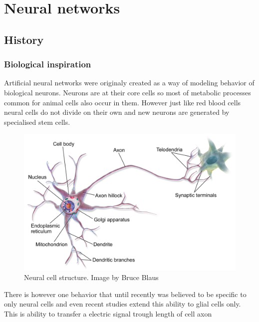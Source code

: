 \chapter{Neural networks}


\section{History}

\subsection{Biological inspiration}
Artificial neural networks were originaly created as a way of modeling behavior of biological
neurons.
Neurons are at their core cells so most of metabolic processes common for animal cells also
occur in them. However just like red blood cells neural cells do not divide on their own and new
neurons are generated by specialised stem cells.
\begin{figure}[hb]
	\includegraphics[width=\textwidth]{res/Blausen_MultipolarNeuron}
	\caption{Neural cell structure. Image by Bruce Blaus}
	\label{fig:Blausen-Neuron}
\end{figure}
There is however one behavior that until recently was believed to be specific to only neural cells
and even recent studies extend this ability to glial cells only.
This is ability to transfer a electric signal trough length of cell axon 

